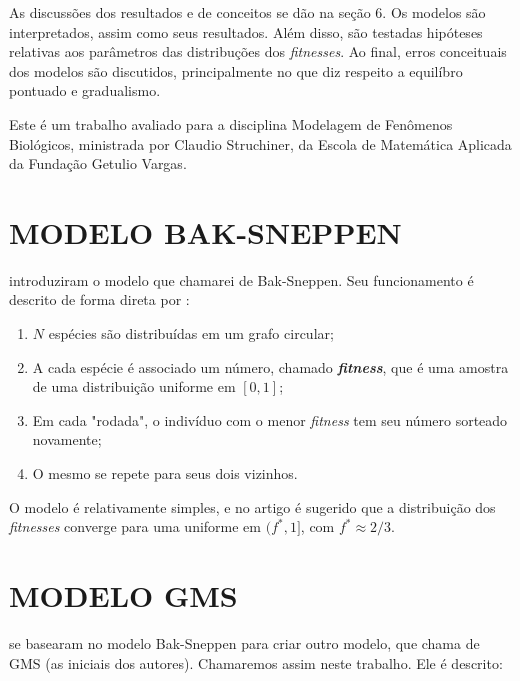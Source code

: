 \documentclass[10pt,brazil,english]{article}
\begin{document}
        As discussões dos resultados e de conceitos se dão na seção 6.
        Os modelos são interpretados, assim como seus resultados.
        Além disso, são testadas hipóteses relativas aos parâmetros das distribuções dos \textit{fitnesses}.
        Ao final, erros conceituais dos modelos são discutidos, principalmente no que diz respeito a equilíbro pontuado e gradualismo.

        Este é um trabalho avaliado para a disciplina Modelagem de Fenômenos Biológicos, ministrada por Claudio Struchiner, da Escola de Matemática Aplicada da Fundação Getulio Vargas.
    
    \section{MODELO BAK-SNEPPEN}

         introduziram o modelo que chamarei de Bak-Sneppen.
        Seu funcionamento é descrito de forma direta por :

        \renewcommand{\theenumi}{\roman{enumi}} 
        \begin{enumerate}
            \item $N$ espécies são distribuídas em um grafo circular;
            \item A cada espécie é associado um número, chamado \textit{\textbf{fitness}}, que é uma amostra de uma distribuição uniforme em $[0, 1]$;
            \item Em cada "rodada", o indivíduo com o menor \textit{fitness} tem seu número sorteado novamente;
            \item O mesmo se repete para seus dois vizinhos.
        \end{enumerate}

        O modelo é relativamente simples, e no artigo é sugerido que a distribuição dos \textit{fitnesses} converge para uma uniforme em $(f^*, 1]$, com $f^* \approx 2/3$.

    \section{MODELO GMS}

         se basearam no modelo Bak-Sneppen para criar outro modelo, que  chama de GMS (as iniciais dos autores). Chamaremos assim neste trabalho. Ele é descrito:
\end{document}
